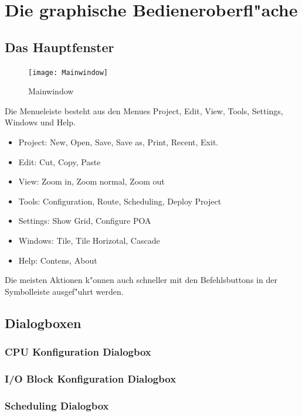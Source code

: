 \documentclass[a4paper,titlepage,12pt,ngerman]{scrbook}
\begin{document}
\chapter{Die graphische Bedieneroberfl"ache}

\section{Das Hauptfenster}
\begin{figure}[htbp]
\begin{center}
\texttt{[image: Mainwindow]}
\caption{Mainwindow}\label{test}
\end{center}
\end{figure}

Die Menueleiste besteht aus den Menues Project, Edit, View, Tools, Settings, Windows und Help.

\begin{itemize}
\item Project:	New, Open, Save, Save as, Print, Recent, Exit.
\item Edit: 	Cut, Copy, Paste
\item View: 	Zoom in, Zoom normal, Zoom out 
\item Tools: 	Configuration, Route, Scheduling, Deploy Project
\item Settings:	Show Grid, Configure POA
\item Windows: 	Tile, Tile Horizotal, Cascade
\item Help: 	Contens, About
\end{itemize}

Die meisten Aktionen k"onnen auch schneller mit den Befehlsbuttons in der Symbolleiste ausgef"uhrt werden.
	
\section{Dialogboxen}

\subsection{CPU Konfiguration Dialogbox}
\subsection{I/O Block Konfiguration Dialogbox}
\subsection{Scheduling Dialogbox}
\end{document}

